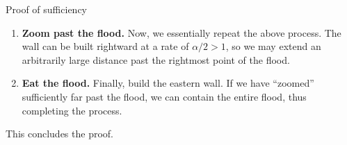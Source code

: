 \begin{customenv}{Proof of sufficiency}
\begin{enumerate}[label=\Roman*.]
            The flood moves rightward at a rate of at most $1$ cell per move, while we can alternate between extending the top wall and the bottom wall, each increasing at a rate of $\alpha/2>1$ cells per move. If the original wall was large enough, the wall can extend past the flood without colliding with it.
        \item \textbf{Zoom past the flood.} Now, we essentially repeat the above process. The wall can be built rightward at a rate of $\alpha/2>1$, so we may extend an arbitrarily large distance past the rightmost point of the flood.
        \item \textbf{Eat the flood.} Finally, build the eastern wall. If we have ``zoomed'' sufficiently far past the flood, we can contain the entire flood, thus completing the process.
    \end{enumerate}
    This concludes the proof.
\end{customenv}

